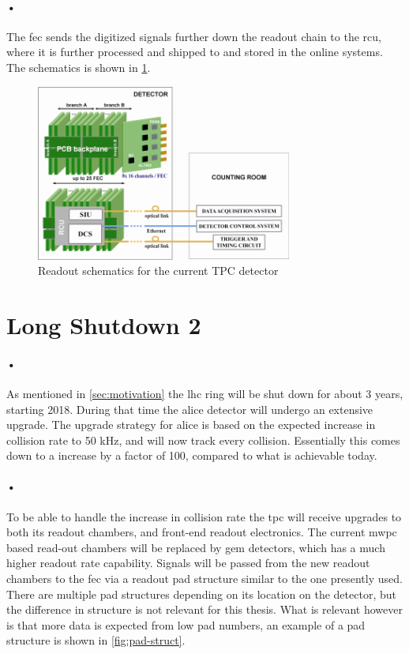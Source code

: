 \documentclass[a4paper, 12pt]{report}\dfrac{\right }{•}
\begin{document}
\paragraph{•}
The \gls{fec} sends the digitized signals further down the readout chain to the \gls{rcu}, where it is further processed and shipped to  and stored in the online systems.
The schematics is shown in \ref{fig:altro}.

\begin{figure}[h!]
  \centering
    \includegraphics[width=0.75\textwidth]{images/altro.png}
     \caption[Readout schematics for the current TPC detector]{Readout schematics for the current TPC detector \cite{tdr-016}}
    \label{fig:altro}
\end{figure}

\section{Long Shutdown 2}
\paragraph{•}
As mentioned in \ref{sec:motivation} the \gls{lhc} ring will be shut down for about 3 years, starting 2018.
During that time the \gls{alice} detector will undergo an extensive upgrade.
The upgrade strategy for \gls{alice} is based on the expected increase in collision rate to 50 kHz, and will now track every collision.
Essentially this comes down to a increase by a factor of 100, compared to what is achievable today.

\paragraph{•} 
To be able to handle the increase in collision rate the \gls{tpc} will receive upgrades to both its readout chambers, and front-end readout electronics.
The current \gls{mwpc} based read-out chambers will be replaced by \gls{gem} detectors, which has a much higher readout rate capability.
Signals will be passed from the new readout chambers to the \gls{fec} via a readout pad structure similar to the one presently used.
There are multiple pad structures depending on its location on the detector, but the difference in structure is not relevant for this thesis.
What is relevant however is that more data is expected from low pad numbers, an example of a pad structure is shown in \ref{fig:pad-struct}.
\end{document}
